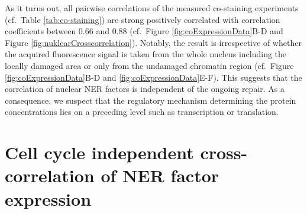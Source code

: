 \noindent As it turns out, all pairwise correlations of the measured co-staining experiments (cf.\ Table \ref{tab:co-staining}) are strong positively correlated with correlation coefficients between 0.66 and 0.88 (cf.\ Figure \ref{fig:coExpressionData}B-D and Figure \ref{fig:nuklearCrosscorrelation}). Notably, the result is irrespective of whether the acquired fluorescence signal is taken from the whole nucleus including the locally damaged area or only from the undamaged chromatin region (cf.\ Figure \ref{fig:coExpressionData}B-D and \ref{fig:coExpressionData}E-F). This suggests that the correlation of nuclear NER factors is independent of the ongoing repair. As a consequence, we suspect that the regulatory mechanism determining the protein concentrations lies on a preceding level such as transcription or translation.\\  



\section {Cell cycle independent cross-correlation of NER factor expression}

